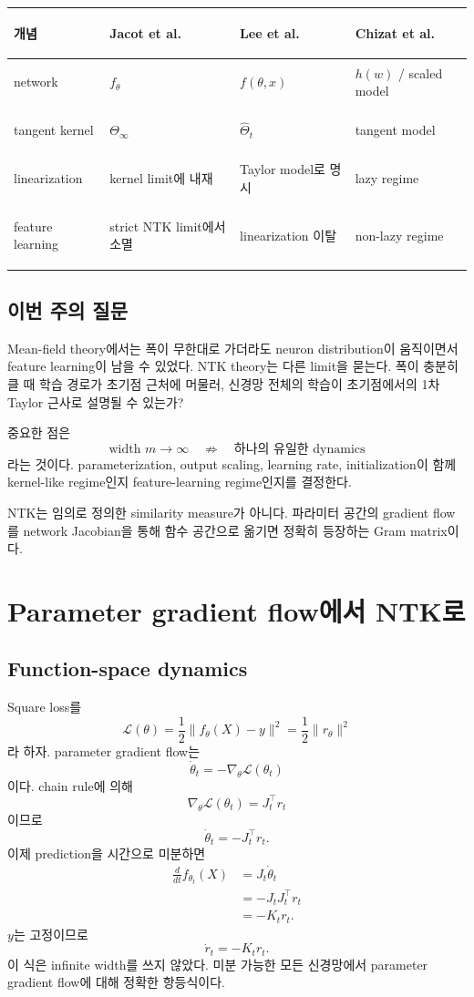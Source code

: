 \documentclass[11pt,a4paper,oneside,openany]{memoir}
\theoremstyle{definition}
\begin{document}
\begin{center}\small
\begin{tabularx}{\textwidth}{>{\bfseries\raggedright\arraybackslash}p{}XXX}
\toprule
개념 & Jacot et al. & Lee et al. & Chizat et al.\\
\midrule
network & $f_\theta$ & $f(\theta,x)$ & $h(w)$ / scaled model\\
tangent kernel & $\Theta_\infty$ & $\hat\Theta_t$ & tangent model\\
linearization & kernel limit에 내재 & Taylor model로 명시 & lazy regime\\
feature learning & strict NTK limit에서 소멸 & linearization 이탈 & non-lazy regime\\
\bottomrule
\end{tabularx}
\end{center}

\section{이번 주의 질문}
Mean-field theory에서는 폭이 무한대로 가더라도 neuron distribution이 움직이면서 feature learning이 남을 수 있었다. NTK theory는 다른 limit을 묻는다. 폭이 충분히 클 때 학습 경로가 초기점 근처에 머물러, 신경망 전체의 학습이 초기점에서의 1차 Taylor 근사로 설명될 수 있는가?

중요한 점은
\[
\text{width }m\to\infty
\quad\not\Rightarrow\quad
\text{하나의 유일한 dynamics}
\]
라는 것이다. parameterization, output scaling, learning rate, initialization이 함께 kernel-like regime인지 feature-learning regime인지를 결정한다.

\begin{presentbox}
NTK는 임의로 정의한 similarity measure가 아니다. 파라미터 공간의 gradient flow를 network Jacobian을 통해 함수 공간으로 옮기면 정확히 등장하는 Gram matrix이다.
\end{presentbox}

\chapter{Parameter gradient flow에서 NTK로}
\section{Function-space dynamics}
Square loss를
\[
\mathcal L(\theta)=\frac12\|f_\theta(X)-y\|^2=\frac12\|r_\theta\|^2
\]
라 하자. parameter gradient flow는
\[
\dot\theta_t=-\nabla_\theta\mathcal L(\theta_t)
\]
이다. chain rule에 의해
\[
\nabla_\theta\mathcal L(\theta_t)=J_t^\top r_t
\]
이므로
\[
\dot\theta_t=-J_t^\top r_t.
\]
이제 prediction을 시간으로 미분하면
\begin{align*}
\frac{d}{dt}f_{\theta_t}(X)
&=J_t\dot\theta_t\\
&=-J_tJ_t^\top r_t\\
&=-K_t r_t.
\end{align*}
$y$는 고정이므로
\[
\boxed{\dot r_t=-K_t r_t.}
\]
이 식은 infinite width를 쓰지 않았다. 미분 가능한 모든 신경망에서 parameter gradient flow에 대해 정확한 항등식이다.
\end{document}
